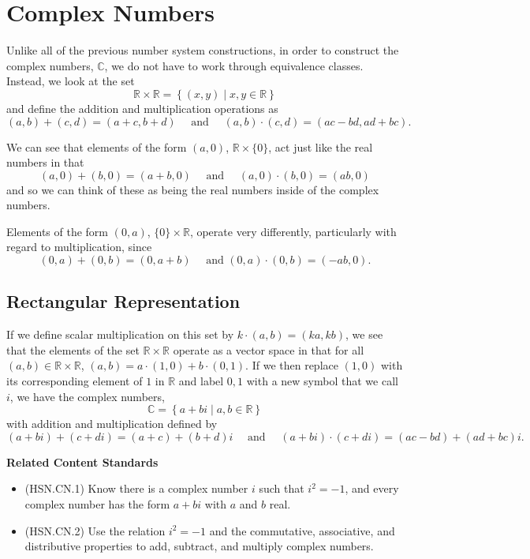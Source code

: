 \documentclass[
]{book}
\providecommand{\tightlist}{%
  \setlength{\itemsep}{0pt}\setlength{\parskip}{0pt}}
\newenvironment{standards}{}{}
\theoremstyle{definition}
\theoremstyle{definition}
\theoremstyle{definition}
\theoremstyle{definition}
\theoremstyle{remark}
\begin{document}
\hypertarget{complex}{%
\section{Complex Numbers}\label{complex}}

Unlike all of the previous number system constructions, in order to construct the complex numbers, \(\mathbb{C}\), we do not have to work through equivalence classes. Instead, we look at the set
\[\mathbb{R} \times \mathbb{R} = \left\{ (x,y) \middle \vert x,y \in \mathbb{R}\right\}\] and define the addition and multiplication operations as
\[(a,b) + (c,d) = (a+c, b+d) \quad \mbox{ and } \quad (a,b) \cdot (c,d) = (ac-bd, ad+bc).\]

We can see that elements of the form \((a,0)\), \(\mathbb{R}\times \{0\}\), act just like the real numbers in that \[(a,0)+(b,0)=(a+b,0) \quad \mbox{ and } \quad (a,0)\cdot (b,0) = (ab,0)\] and so we can think of these as being the real numbers inside of the complex numbers.

Elements of the form \((0,a)\), \(\{0\}\times \mathbb{R}\), operate very differently, particularly with regard to multiplication, since
\[(0,a)+(0,b)=(0,a+b) \quad \mbox{ and }  (0,a) \cdot (0,b) = (-ab,0).\]

\hypertarget{rectangular-representation}{%
\subsection{Rectangular Representation}\label{rectangular-representation}}

If we define scalar multiplication on this set by \(k \cdot (a,b) = (ka,kb)\), we see that the elements of the set \(\mathbb{R} \times \mathbb{R}\) operate as a vector space in that for all \((a,b) \in \mathbb{R}\times \mathbb{R}\), \((a,b) = a \cdot (1,0) + b \cdot (0,1)\). If we then replace \((1,0)\) with its corresponding element of \(1\) in \(\mathbb{R}\) and label \(0,1\) with a new symbol that we call \(i\), we have the complex numbers, \[\mathbb{C} = \left\{ a+bi\middle \vert a, b\in \mathbb{R}\right\}\] with addition and multiplication defined by
\[(a+bi) + (c+di) = (a+c) + (b+d)i \quad \mbox{ and } \quad (a+bi) \cdot (c+di) = (ac-bd) + (ad+bc)i.\]

\begin{standards}

\begin{center}
\textbf{Related Content Standards}

\end{center}

\begin{itemize}
\tightlist
\item
  (HSN.CN.1) Know there is a complex number \(i\) such that \(i^2 = -1\), and every complex number has the form \(a + bi\) with \(a\) and \(b\) real.
\item
  (HSN.CN.2) Use the relation \(i^2 = -1\) and the commutative, associative, and distributive properties to add, subtract, and multiply complex numbers.\\
\end{itemize}

\end{standards}
\end{document}
